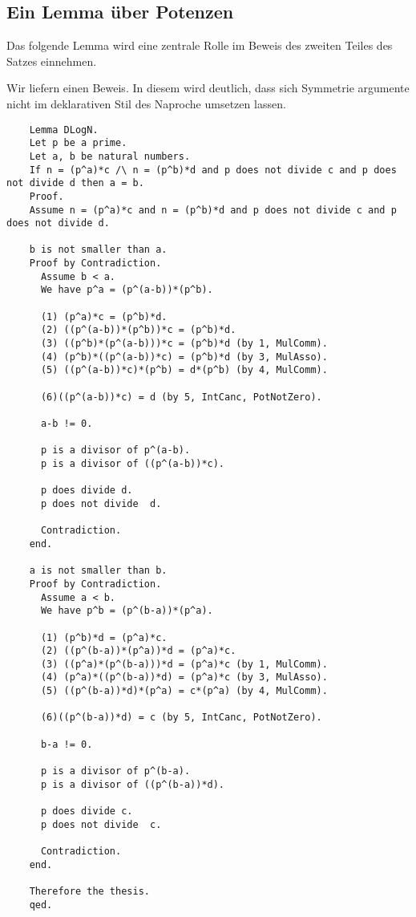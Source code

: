 \documentclass[a4paper,12pt]{scrartcl}
\begin{document}
\subsection{Ein Lemma über Potenzen}

Das folgende Lemma wird eine zentrale Rolle im Beweis des zweiten Teiles des Satzes einnehmen.

Wir liefern einen Beweis. In diesem wird deutlich, dass sich Symmetrie argumente nicht im deklarativen Stil des Naproche umsetzen lassen.

\begin{lstlisting}
	Lemma DLogN.
	Let p be a prime.
	Let a, b be natural numbers.
	If n = (p^a)*c /\ n = (p^b)*d and p does not divide c and p does not divide d then a = b.
	Proof.
	Assume n = (p^a)*c and n = (p^b)*d and p does not divide c and p does not divide d.
	
	b is not smaller than a.
	Proof by Contradiction.
	  Assume b < a.
	  We have p^a = (p^(a-b))*(p^b).
	
	  (1) (p^a)*c = (p^b)*d.
	  (2) ((p^(a-b))*(p^b))*c = (p^b)*d.
	  (3) ((p^b)*(p^(a-b)))*c = (p^b)*d (by 1, MulComm).
	  (4) (p^b)*((p^(a-b))*c) = (p^b)*d (by 3, MulAsso).
	  (5) ((p^(a-b))*c)*(p^b) = d*(p^b) (by 4, MulComm).
	  
	  (6)((p^(a-b))*c) = d (by 5, IntCanc, PotNotZero).
	  
	  a-b != 0.
	
	  p is a divisor of p^(a-b).
	  p is a divisor of ((p^(a-b))*c).
	
	  p does divide d.
	  p does not divide  d.
	
	  Contradiction.
	end.
	
	a is not smaller than b.
	Proof by Contradiction.
	  Assume a < b.
	  We have p^b = (p^(b-a))*(p^a).
	
	  (1) (p^b)*d = (p^a)*c.
	  (2) ((p^(b-a))*(p^a))*d = (p^a)*c.
	  (3) ((p^a)*(p^(b-a)))*d = (p^a)*c (by 1, MulComm).
	  (4) (p^a)*((p^(b-a))*d) = (p^a)*c (by 3, MulAsso).
	  (5) ((p^(b-a))*d)*(p^a) = c*(p^a) (by 4, MulComm).
	  
	  (6)((p^(b-a))*d) = c (by 5, IntCanc, PotNotZero).
	  
	  b-a != 0.
	
	  p is a divisor of p^(b-a).
	  p is a divisor of ((p^(b-a))*d).
	
	  p does divide c.
	  p does not divide  c.
	
	  Contradiction.
	end.
	
	Therefore the thesis.
	qed.
\end{lstlisting}
\end{document}
